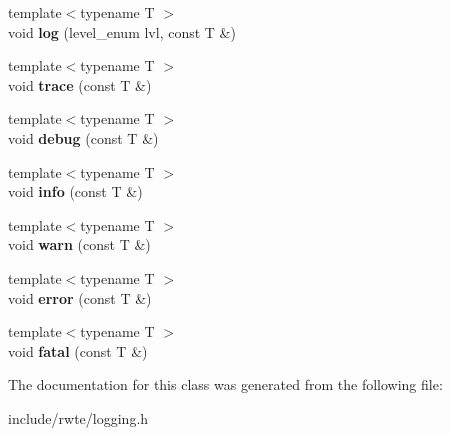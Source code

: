 \begin{DoxyCompactItemize}
{\footnotesize template$<$typename T $>$ }\\void {\bfseries log} (level\+\_\+enum lvl, const T \&)
\item 
\mbox{\label{classlogging_1_1Logger_afe1625ac4624fda3d8826e4be966c711}} 
{\footnotesize template$<$typename T $>$ }\\void {\bfseries trace} (const T \&)
\item 
\mbox{\label{classlogging_1_1Logger_a106668f8208d41ae498aec08d965351c}} 
{\footnotesize template$<$typename T $>$ }\\void {\bfseries debug} (const T \&)
\item 
\mbox{\label{classlogging_1_1Logger_a280960827e9b058864e78672fe64b8e3}} 
{\footnotesize template$<$typename T $>$ }\\void {\bfseries info} (const T \&)
\item 
\mbox{\label{classlogging_1_1Logger_a9e04b11bf7b4b6026d4f44a0fae4f44f}} 
{\footnotesize template$<$typename T $>$ }\\void {\bfseries warn} (const T \&)
\item 
\mbox{\label{classlogging_1_1Logger_a9ad1f20fcdb3e97395232c76160c7890}} 
{\footnotesize template$<$typename T $>$ }\\void {\bfseries error} (const T \&)
\item 
\mbox{\label{classlogging_1_1Logger_af47e80ea44904db87b2d68aca6d642a6}} 
{\footnotesize template$<$typename T $>$ }\\void {\bfseries fatal} (const T \&)
\end{DoxyCompactItemize}


The documentation for this class was generated from the following file\+:\begin{DoxyCompactItemize}
\item 
include/rwte/logging.\+h\end{DoxyCompactItemize}
